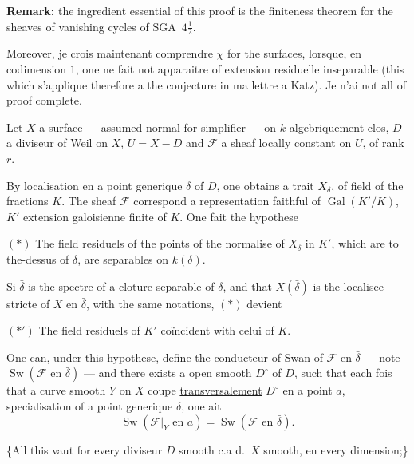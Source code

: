 \documentclass[11pt,a4paper]{article}
\theoremstyle{plain}
\theoremstyle{definition}
\DeclareMathOperator{\Sw}{Sw}
\DeclareMathOperator{\Gal}{Gal}
\begin{document}
\newpage

\noindent \textbf{Remark:} the ingredient essential of this proof is the finiteness theorem for the sheaves of vanishing cycles of SGA~$4\frac{1}{2}$.

\bigskip

Moreover, je crois maintenant comprendre $\chi$ for the surfaces, lorsque, en codimension $1$, one ne fait not apparaitre of extension residuelle inseparable (this which s'applique therefore a the conjecture in ma lettre a Katz). Je n'ai not all of proof complete.

Let $X$ a surface --- assumed normal for simplifier --- on $k$ algebriquement clos, $D$ a diviseur of Weil on $X$, $U = X - D$ and $\mathcal{F}$ a sheaf locally constant on $U$, of rank $r$.

\medskip

By localisation en a point generique $\delta$ of $D$, one obtains a trait $X_\delta$, of field of the fractions $K$. The sheaf $\mathcal{F}$ correspond a representation faithful of $\Gal(K'/K)$, $K'$ extension galoisienne finite of $K$. One fait the hypothese

\medskip

$(*)$ The field residuels of the points of the normalise of $X_\delta$ in $K'$, which are to the-dessus of $\delta$, are separables on $k(\delta)$.

\medskip

Si $\bar{\delta}$ is the spectre of a cloture separable of $\delta$, and that $X(\bar{\delta})$ is the localisee stricte of $X$ en $\bar{\delta}$, with the same notations, $(*)$ devient

$(*')$ The field residuels of $K'$ co\"incident with celui of $K$.

\medskip

One can, under this hypothese, define the \underline{conducteur of Swan} of $\mathcal{F}$ en $\bar{\delta}$ --- note $\Sw(\mathcal{F} \text{ en } \bar{\delta})$ --- and there exists a open smooth $D^\circ$ of $D$, such that each fois that a curve smooth $Y$ on $X$ coupe \underline{transversalement} $D^\circ$ en a point $a$, specialisation of a point generique $\delta$, one ait
\[
\Sw(\mathcal{F}|_Y \text{ en } a) = \Sw(\mathcal{F} \text{ en } \bar{\delta}).
\]

\begin{flushright}
\begin{minipage}{0.5\textwidth}
\{All this vaut for every diviseur $D$ smooth c.a d.\ $X$ smooth, en every dimension;\}
\end{minipage}
\end{flushright}
\end{document}
